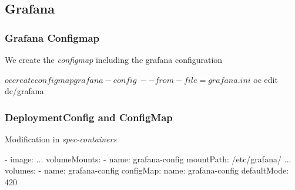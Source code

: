 \subsection{Grafana}

\begin{frame}[fragile]
  \frametitle{Grafana Configmap}
  We create the \emph{configmap} including the grafana configuration \\
  \begin{bashcode}
    $ oc create configmap grafana-config \
    --from-file=grafana.ini
    $ oc edit dc/grafana
  \end{bashcode}
\end{frame}

\begin{frame}[fragile]
  \frametitle{DeploymentConfig and ConfigMap}
  Modification in \emph{spec-containers}
  \begin{yamlcode}
    - image:
      ...
      volumeMounts:
      - name: grafana-config
        mountPath: /etc/grafana/
      ...
    volumes:
    - name: grafana-config
      configMap:
        name: grafana-config
        defaultMode: 420
  \end{yamlcode}
\end{frame}